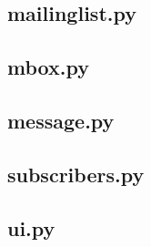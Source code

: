 \subsection*{mailinglist.py}



\subsection*{mbox.py}



\subsection*{message.py}



\subsection*{subscribers.py}



\subsection*{ui.py}


